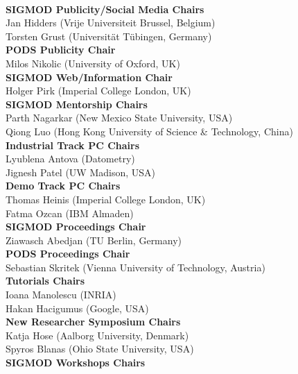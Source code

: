 {\\[2.4ex]
\textbf{SIGMOD Publicity/Social Media Chairs}
\\ Jan Hidders \textsf{\footnotesize(Vrije Universiteit Brussel, Belgium)}
\\ Torsten Grust \textsf{\footnotesize(Universität Tübingen, Germany)}
\\[2.4ex]
\textbf{PODS Publicity Chair}
\\ Milos Nikolic \textsf{\footnotesize(University of Oxford, UK)}
\\[2.4ex]
\textbf{SIGMOD Web/Information Chair}
\\ Holger Pirk \textsf{\footnotesize(Imperial College London, UK)}
\\[2.4ex]
\textbf{SIGMOD Mentorship Chairs}
\\ Parth Nagarkar \textsf{\footnotesize(New Mexico State University, USA)}
\\ Qiong Luo \textsf{\footnotesize(Hong Kong University of Science \& Technology, China)}
\\[2.4ex]
\textbf{Industrial Track PC Chairs}
\\ Lyublena Antova \textsf{\footnotesize(Datometry)}
\\ Jignesh Patel \textsf{\footnotesize(UW Madison, USA)}
\\[2.4ex]
\textbf{Demo Track PC Chairs}
\\ Thomas Heinis \textsf{\footnotesize(Imperial College London, UK)}
\\ Fatma Ozcan \textsf{\footnotesize(IBM Almaden)}
\\[2.4ex]
\textbf{SIGMOD Proceedings Chair}
\\ Ziawasch Abedjan \textsf{\footnotesize(TU Berlin, Germany)}
\\[2.4ex]
\textbf{PODS Proceedings Chair}
\\ Sebastian Skritek \textsf{\footnotesize(Vienna University of Technology, Austria)}
\\[2.4ex]
\textbf{Tutorials Chairs}
\\ Ioana Manolescu \textsf{\footnotesize(INRIA)}
\\ Hakan Hacigumus \textsf{\footnotesize(Google, USA)}
\\[2.4ex]
\textbf{New Researcher Symposium Chairs}
\\ Katja Hose \textsf{\footnotesize(Aalborg University, Denmark)}
\\ Spyros Blanas \textsf{\footnotesize(Ohio State University, USA)}
\\[2.4ex]
\textbf{SIGMOD Workshops Chairs}
}

